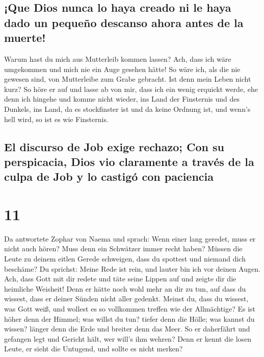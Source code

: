 \hypertarget{que-dios-nunca-lo-haya-creado-ni-le-haya-dado-un-pequeuxf1o-descanso-ahora-antes-de-la-muerte}{%
\subsection{¡Que Dios nunca lo haya creado ni le haya dado un pequeño
descanso ahora antes de la
muerte!}\label{que-dios-nunca-lo-haya-creado-ni-le-haya-dado-un-pequeuxf1o-descanso-ahora-antes-de-la-muerte}}

 Warum hast du mich aus Mutterleib kommen lassen? Ach,
dass ich wäre umgekommen und mich nie ein Auge gesehen hätte!
 So wäre ich, als die nie gewesen sind, von Mutterleibe
zum Grabe gebracht.  Ist denn mein Leben nicht kurz? So
höre er auf und lasse ab von mir, dass ich ein wenig erquickt werde,
 ehe denn ich hingehe und komme nicht wieder, ins Land
der Finsternis und des Dunkels,  ins Land, da es
stockfinster ist und da keine Ordnung ist, und wenn's hell wird, so ist
es wie Finsternis.

\hypertarget{el-discurso-de-job-exige-rechazo-con-su-perspicacia-dios-vio-claramente-a-travuxe9s-de-la-culpa-de-job-y-lo-castiguxf3-con-paciencia}{%
\subsection{El discurso de Job exige rechazo; Con su perspicacia, Dios
vio claramente a través de la culpa de Job y lo castigó con
paciencia}\label{el-discurso-de-job-exige-rechazo-con-su-perspicacia-dios-vio-claramente-a-travuxe9s-de-la-culpa-de-job-y-lo-castiguxf3-con-paciencia}}

\hypertarget{section-10}{%
\section{11}\label{section-10}}

 Da antwortete Zophar von Naema und sprach: 
Wenn einer lang geredet, muss er nicht auch hören? Muss denn ein
Schwätzer immer recht haben?  Müssen die Leute zu deinem
eitlen Gerede schweigen, dass du spottest und niemand dich beschäme?
 Du sprichst: Meine Rede ist rein, und lauter bin ich vor
deinen Augen.  Ach, dass Gott mit dir redete und täte
seine Lippen auf  und zeigte dir die heimliche Weisheit!
Denn er hätte noch wohl mehr an dir zu tun, auf dass du wissest, dass er
deiner Sünden nicht aller gedenkt.  Meinst du, dass du
wissest, was Gott weiß, und wollest es so vollkommen treffen wie der
Allmächtige?  Es ist höher denn der Himmel; was willst du
tun? tiefer denn die Hölle; was kannst du wissen?  länger
denn die Erde und breiter denn das Meer.  So er
daherfährt und gefangen legt und Gericht hält, wer will's ihm wehren?
 Denn er kennt die losen Leute, er sieht die Untugend,
und sollte es nicht merken?

